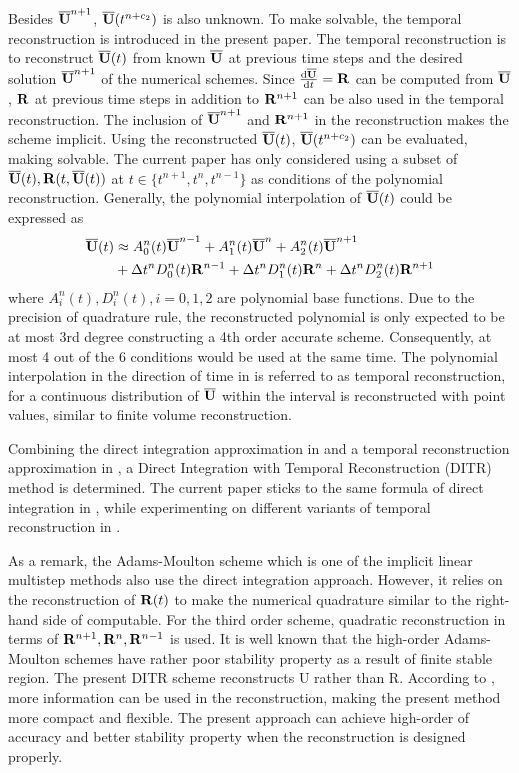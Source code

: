 Besides $\overline{\mathbf{U}}^{n+1}$, $\overline{\mathbf{U}}(t^{n+c_2})$ is also unknown.
To make 
solvable, the temporal reconstruction is introduced in the
present paper.
The temporal reconstruction is to reconstruct $\overline{\mathbf{U}}(t)$
from known $\overline{\mathbf{U}}$ at previous time steps and the desired
solution $\overline{\mathbf{U}}^{n+1}$ of the numerical schemes. Since $\frac{\dd\overline{\mathbf{U}}}{\dd t}=\mathbf{R}$
can be computed from  $\overline{\mathbf{U}}$, $\mathbf{R}$ at previous time steps in
addition to $\mathbf{R}^{n+1}$ can be also used in the temporal reconstruction.
The inclusion of $\overline{\mathbf{U}}^{n+1}$ and $\mathbf{R}^{n+1}$ in the reconstruction
makes the scheme implicit.
Using the reconstructed $\overline{\mathbf{U}}(t)$, $\overline{\mathbf{U}}(t^{n+c_2})$
can be evaluated, making  solvable.
The current paper has only considered using a subset of
$\overline{\mathbf{U}}(t), \mathbf{R}(t, \overline{\mathbf{U}}(t))$ at $t \in \{t^{n+1}, t^n, t^{n-1}\}$
as conditions of the polynomial reconstruction.
Generally, the polynomial interpolation
of $\overline{\mathbf{U}}(t)$ could be expressed as
\begin{equation}
    \begin{aligned}
        \label{eq:TR}
        \overline{\mathbf{U}}(t) & \approx
        A^n_0(t)\overline{\mathbf{U}}^{n - 1} +
        A^n_1(t)\overline{\mathbf{U}}^{n} +
        A^n_2(t)\overline{\mathbf{U}}^{n + 1}
        \\ & +
        {\Delta} t^n D^n_0(t)\mathbf{R}^{n - 1} +
        {\Delta} t^n D^n_1(t)\mathbf{R}^{n} +
        {\Delta} t^n D^n_2(t)\mathbf{R}^{n + 1}
    \end{aligned}
\end{equation}
where $A^n_i(t), D^n_i(t), i=0,1,2$
are polynomial base functions.
Due to the precision of quadrature rule,
the reconstructed polynomial is only expected to be at most 3rd degree
constructing a 4th order accurate scheme.
Consequently, at most 4 out of the
6 conditions would be used at the same time.
The polynomial interpolation in the direction of time in 
is referred to as temporal reconstruction, for
a continuous distribution of $\overline{\mathbf{U}}$ within the interval
is reconstructed with point values,
similar to finite volume reconstruction.

Combining the direct integration approximation in 
and a temporal reconstruction approximation in ,
a Direct Integration with Temporal Reconstruction (DITR) method is
determined.
The current paper sticks to the same formula of direct integration
in , while experimenting on different
variants of temporal reconstruction in .

As a remark, the Adams-Moulton scheme which is one of the
implicit linear multistep methods also use the direct
integration approach.
However, it relies on the
reconstruction of $\mathbf{R}(t)$ to make the numerical quadrature
similar to the right-hand side of  computable.
For the third order scheme, quadratic reconstruction in terms
of $\mathbf{R}^{n+1},\mathbf{R}^{n},\mathbf{R}^{n-1}$ is used.
It is well known that the high-order
Adams-Moulton schemes have rather poor stability
property as a result of finite stable region.
The present DITR scheme reconstructs U rather
than R. According to ,
more information can be used
in the reconstruction, making the present method more
compact and flexible. The present approach can achieve
high-order of accuracy and better stability property when
the reconstruction is designed properly.

